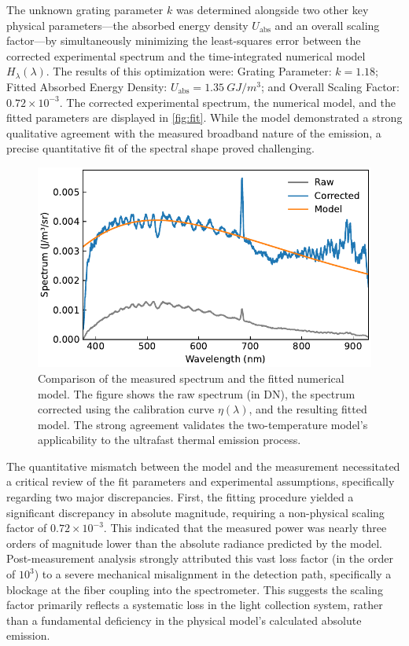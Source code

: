\documentclass[
	a4paper,
]{scrarticle}
\begin{document}
The unknown grating parameter $k$ was determined alongside two other key physical parameters—the absorbed energy density $U_{\text{abs}}$ and an overall scaling factor—by simultaneously minimizing the least-squares error between the corrected experimental spectrum and the time-integrated numerical model $H_\lambda(\lambda)$. The results of this optimization were: Grating Parameter: $k=1.18$; Fitted Absorbed Energy Density: $U_{\text{abs}} = \SI{1.35}{GJ/m^3}$; and Overall Scaling Factor: $0.72 \times 10^{-3}$. The corrected experimental spectrum, the numerical model, and the fitted parameters are displayed in \autoref{fig:fit}. While the model demonstrated a strong qualitative agreement with the measured broadband nature of the emission, a precise quantitative fit of the spectral shape proved challenging.

\begin{figure}[h]
    \centering
    \includegraphics{../analysis/figures/combined.fit.pdf}
    \caption{Comparison of the measured spectrum and the fitted numerical model. The figure shows the raw spectrum (in DN), the spectrum corrected using the calibration curve $\eta(\lambda)$, and the resulting fitted model. The strong agreement validates the two-temperature model's applicability to the ultrafast thermal emission process.}
    \label{fig:fit}
\end{figure}

The quantitative mismatch between the model and the measurement necessitated a critical review of the fit parameters and experimental assumptions, specifically regarding two major discrepancies. First, the fitting procedure yielded a significant discrepancy in absolute magnitude, requiring a non-physical scaling factor of $0.72 \times 10^{-3}$. This indicated that the measured power was nearly three orders of magnitude lower than the absolute radiance predicted by the model. Post-measurement analysis strongly attributed this vast loss factor (in the order of $10^3$) to a severe mechanical misalignment in the detection path, specifically a blockage at the fiber coupling into the spectrometer. This suggests the scaling factor primarily reflects a systematic loss in the light collection system, rather than a fundamental deficiency in the physical model's calculated absolute emission.
\end{document}
